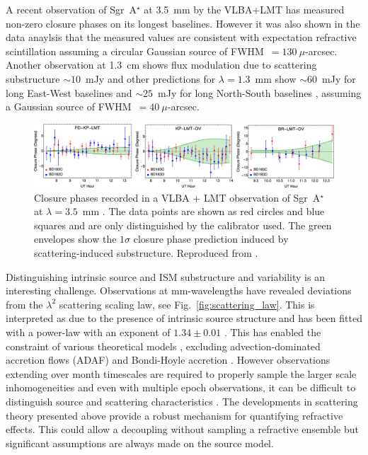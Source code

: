 A recent observation of Sgr~A$^\star$ at 3.5~mm by the VLBA+LMT \citep[see Fig.~ref{fig:substructure2}][]{Ortiz_2016} has measured non-zero closure phases on its longest baselines. However it was also shown in the data anaylsis that the measured values are consistent with expectation refractive scintillation assuming a circular Gaussian source of FWHM~$=130\ \mu$-arcsec. Another observation at 1.3~cm shows flux modulation due to scattering substructure $\sim 10$~mJy \citep{Gwinn_2014} and other predictions for $\lambda = 1.3$~mm show $\sim 60$~mJy for long East-West baselines and $\sim 25$~mJy for long North-South baselines \citep*{Johnson_2015a}, assuming a Gaussian source of FWHM~$=40\ \mu$-arcsec.

\begin{figure}
\begin{center}
\includegraphics[width=\columnwidth]{Images/ism_cp}
\caption{Closure phases recorded in a VLBA + LMT observation of  Sgr~A$^\star$ at $\lambda = 3.5$~mm \protect\cite{Ortiz_2016}. The data points are shown as red circles and blue squares and are only distinguished by the calibrator used. The green envelopes show the $1\sigma$ closure phase prediction induced by scattering-induced substructure. Reproduced from \protect\citet{Ortiz_2016}. \label{fig:substructure2}
}
\end{center}
\end{figure}


Distinguishing intrinsic source and ISM substructure and variability is an interesting challenge. Observations at mm-wavelengths have revealed deviations from the $\lambda^2$ scattering scaling law, see Fig.~\ref{fig:scattering_law}. This is interpreted as due to the presence of intrinsic source structure and has been fitted with a power-law with an exponent of $1.34 \pm 0.01$ \cite{Lu_2011}. This has enabled the constraint of various theoretical models \cite{Bower_2006}, excluding advection-dominated accretion flows (ADAF) \cite{Narayan_1998} and Bondi-Hoyle accretion \cite{Melia_1994}. However observations extending over month timescales are required to properly sample the larger scale inhomogeneities and even with multiple epoch observations, it can be difficult to distinguish source and scattering characteristics \citep*{Macquart_2006}. The developments in scattering theory presented above provide a robust mechanism for quantifying refractive effects. This could allow a decoupling without sampling a refractive ensemble but significant assumptions are always made on the source model. 


